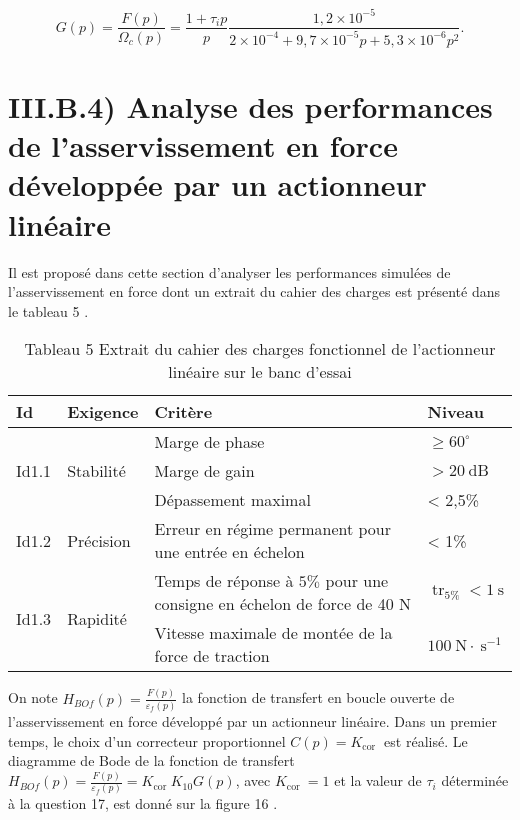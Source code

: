 $$
G(p)=\frac{F(p)}{\Omega_{c}(p)}=\frac{1+\tau_{i} p}{p} \frac{1,2 \times 10^{-5}}{2 \times 10^{-4}+9,7 \times 10^{-5} p+5,3 \times 10^{-6} p^{2}} .
$$

\section{III.B.4) Analyse des performances de l'asservissement en force développée par un actionneur linéaire}
Il est proposé dans cette section d'analyser les performances simulées de l'asservissement en force dont un extrait du cahier des charges est présenté dans le tableau 5 .

\begin{table}[h]
\begin{center}
\begin{tabular}{|l|l|l|l|}
\hline
Id & Exigence & Critère & Niveau \\
\hline
\multirow[t]{3}{*}{Id1.1} & \multirow[t]{3}{*}{Stabilité} & Marge de phase & $\geqslant 60^{\circ}$ \\
\hline
 &  & Marge de gain & $>20 \mathrm{~dB}$ \\
\hline
 &  & Dépassement maximal & < 2,5\% \\
\hline
Id1.2 & Précision & Erreur en régime permanent pour une entrée en échelon & < 1\% \\
\hline
\multirow[t]{2}{*}{Id1.3} & \multirow[t]{2}{*}{Rapidité} & Temps de réponse à $5 \%$ pour une consigne en échelon de force de 40 N & $\operatorname{tr}_{5 \%}<1 \mathrm{~s}$ \\
\hline
 &  & Vitesse maximale de montée de la force de traction & $100 \mathrm{~N} \cdot \mathrm{~s}^{-1}$ \\
\hline
\end{tabular}
\captionsetup{labelformat=empty}
\caption{Tableau 5 Extrait du cahier des charges fonctionnel de l'actionneur linéaire sur le banc d'essai}
\end{center}
\end{table}

On note $H_{B O f}(p)=\frac{F(p)}{\varepsilon_{f}(p)}$ la fonction de transfert en boucle ouverte de l'asservissement en force développé par un actionneur linéaire. Dans un premier temps, le choix d'un correcteur proportionnel $C(p)=K_{\text {cor }}$ est réalisé. Le diagramme de Bode de la fonction de transfert $H_{B O f}(p)=\frac{F(p)}{\varepsilon_{f}(p)}=K_{\text {cor }} K_{10} G(p)$, avec $K_{\text {cor }}=1$ et la valeur de $\tau_{i}$ déterminée à la question 17, est donné sur la figure 16 .

